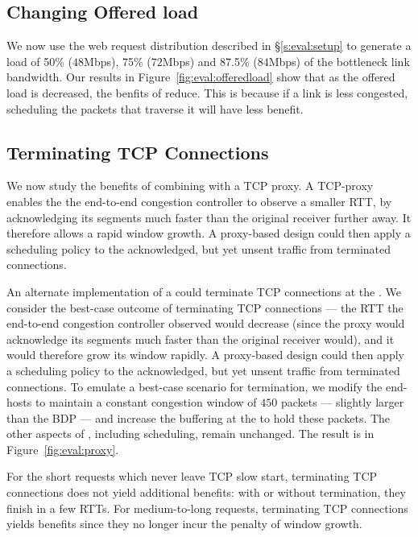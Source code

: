 

\subsection{Changing Offered load}\label{s:eval:offeredload}
We now use the web request distribution described in \S\ref{s:eval:setup} to generate a load of 50\% ($48$Mbps), 75\% ($72$Mbps) and 87.5\% ($84$Mbps) of the bottleneck link bandwidth. Our results in Figure~\ref{fig:eval:offeredload} show that as the offered load is decreased, the benfits of \name reduce. This is because if a link is less congested, scheduling the packets that traverse it will have less benefit.



\subsection{Terminating TCP Connections}\label{s:eval:proxy}

We now study the benefits of combining \name with a TCP proxy. A TCP-proxy enables the the end-to-end congestion controller to observe a smaller RTT, by acknowledging its segments much faster than the original receiver further away. It therefore allows a rapid window growth.
A proxy-based design could then apply a scheduling policy to the acknowledged, but yet unsent traffic from terminated connections.



An alternate implementation of a \name could terminate TCP connections at the \inbox. 
We consider the best-case outcome of terminating TCP connections --- the RTT the end-to-end congestion controller observed would decrease (since the proxy would acknowledge its segments much faster than the original receiver would), and it would therefore grow its window rapidly.
A proxy-based design could then apply a scheduling policy to the acknowledged, but yet unsent traffic from terminated connections.
To emulate a best-case scenario for termination, we modify the end-hosts to maintain a constant congestion window of $450$ packets --- slightly larger than the BDP --- and increase the buffering at the \inbox to hold these packets. 
The other aspects of \name, including scheduling, remain unchanged.
The result is in Figure~\ref{fig:eval:proxy}.
%

%
For the short requests which never leave TCP slow start, terminating TCP connections does not yield additional benefits: with or without termination, they finish in a few RTTs.
For medium-to-long requests, terminating TCP connections yields benefits since they no longer incur the penalty of window growth.
